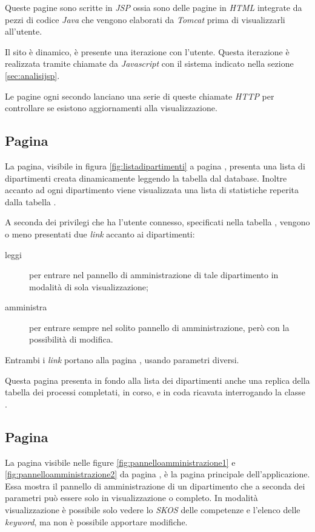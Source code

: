 \documentclass[tesi.tex]{subfiles}
\begin{document}
Queste pagine sono scritte in \emph{JSP} ossia sono delle pagine in
\emph{HTML} integrate da pezzi di codice \emph{Java} che vengono
elaborati da \emph{Tomcat} prima di visualizzarli all'utente.

Il sito \`e dinamico, \`e presente una iterazione con l'utente. Questa
iterazione \`e realizzata tramite chiamate da \emph{Javascript} con il
sistema indicato nella sezione \ref{sec:analisijsp}.

Le pagine ogni secondo lanciano una serie di queste chiamate
\emph{HTTP} per controllare se esistono aggiornamenti alla
visualizzazione. 

\subsection{Pagina }
La pagina, visibile in figura \ref{fig:listadipartimenti} a pagina
\pageref{fig:listadipartimenti}, presenta una lista di dipartimenti creata dinamicamente
leggendo la tabella  dal database. Inoltre accanto ad
ogni dipartimento viene visualizzata una lista di statistiche reperita
dalla tabella .

A seconda dei privilegi che ha l'utente connesso, specificati nella tabella , vengono o meno
presentati due \emph{link} accanto ai dipartimenti:
\begin{description}
\item[leggi] per entrare nel pannello di amministrazione di tale
  dipartimento in modalit\`a di sola visualizzazione;
\item[amministra] per entrare sempre nel solito pannello di
  amministrazione, per\`o con la possibilit\`a di modifica.
\end{description}

Entrambi i \emph{link} portano alla pagina , usando
parametri diversi.

Questa pagina presenta in fondo alla lista dei dipartimenti anche una
replica della tabella dei processi completati, in corso, e in coda
ricavata interrogando la classe .

\subsection{Pagina }
La pagina  visibile nelle figure
\ref{fig:pannelloamministrazione1} e
\ref{fig:pannelloamministrazione2} da pagina
\pageref{fig:pannelloamministrazione1}, \`e la pagina principale
dell'applicazione. Essa mostra il pannello di amministrazione di un
dipartimento che a
seconda dei parametri pu\`o essere solo in visualizzazione o
completo. In modalit\`a visualizzazione \`e possibile solo vedere
lo \emph{SKOS} delle competenze e l'elenco delle \emph{keyword}, ma
non \`e possibile apportare modifiche.
\end{document}
